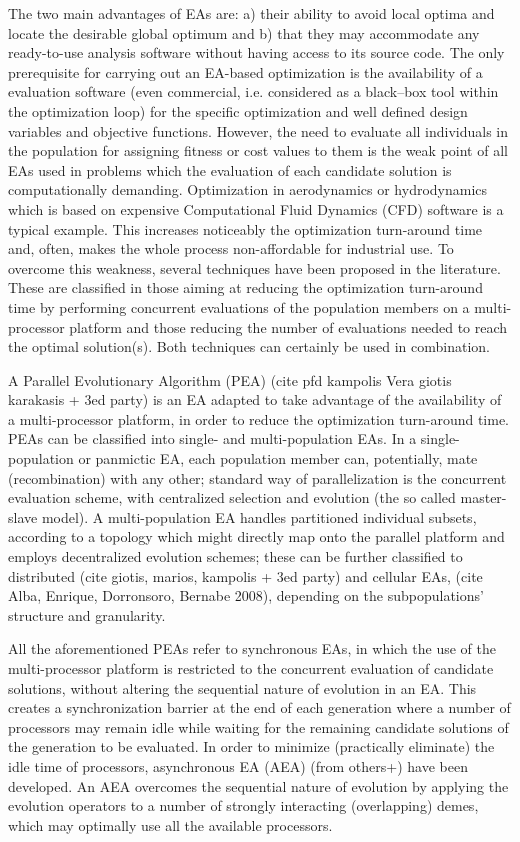 The two main advantages of EAs are: a) their ability to avoid local optima and locate the desirable global optimum and b) that they may accommodate any ready-to-use analysis software without having access to its source code. The only prerequisite for carrying out an EA-based optimization is the availability of a evaluation software (even commercial, i.e. considered as a black–box tool within the optimization loop) for the specific optimization  and well defined design variables and objective functions. However, the need to evaluate all individuals in the population for assigning fitness or cost values to them is the weak point of all EAs used in problems which the evaluation of each candidate solution is computationally demanding. Optimization in aerodynamics or hydrodynamics which is based on expensive Computational Fluid Dynamics (CFD) software is a typical example.  This increases noticeably the optimization turn-around time and, often, makes the whole process non-affordable for industrial use. To overcome this weakness, several techniques have been proposed in the literature. These  are classified in those aiming at reducing the optimization turn-around time by performing concurrent evaluations of the population members on a multi-processor platform and those reducing the number of evaluations needed to reach the optimal solution(s). Both techniques can certainly be used in combination.   

A Parallel Evolutionary Algorithm (PEA) (cite pfd kampolis Vera giotis karakasis + 3ed party) is an EA adapted to take advantage of the availability of a multi-processor platform, in order to reduce the optimization turn-around time. PEAs can be classified into single- and multi-population EAs. In a single-population or panmictic EA, each population member can, potentially, mate (recombination) with any other; standard way of parallelization is the concurrent evaluation scheme, with centralized selection and evolution (the so called master-slave model). A multi-population EA handles partitioned individual subsets, according to a topology which might directly map onto the parallel platform and employs decentralized evolution schemes; these can be further classified to distributed (cite giotis, marios, kampolis + 3ed party) and cellular EAs, (cite Alba, Enrique, Dorronsoro, Bernabe 2008), depending on the subpopulations’ structure and granularity. 

All the aforementioned PEAs refer to synchronous EAs, in which the use of the multi-processor platform is restricted to the concurrent evaluation of candidate solutions, without altering the sequential nature of evolution in an EA. This creates a synchronization barrier at the end of each generation where a number of processors may remain idle while waiting for the remaining candidate solutions of the generation to be evaluated.  In order to minimize (practically eliminate) the idle time of processors, asynchronous EA (AEA) (from others+\cite{LTT_2_040}) have been developed. An AEA overcomes the sequential nature of evolution by applying the evolution operators to a number of strongly interacting (overlapping) demes, which may optimally use all the available processors.     

